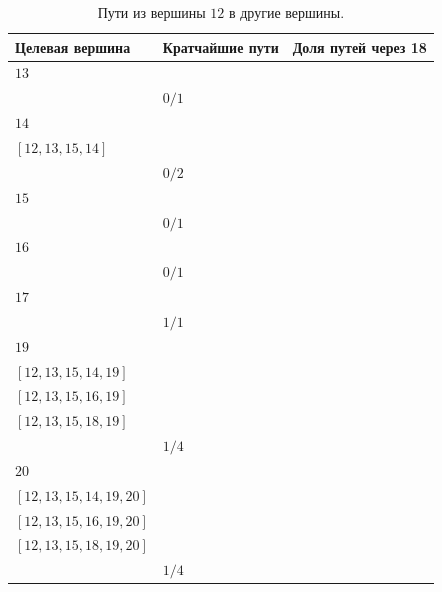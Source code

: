 \documentclass[12pt, a4paper]{extarticle}
\begin{document}
\begin{table}[h!]
    \caption{Пути из вершины $12$ в другие вершины.}
    \label{tbl:10-12}
    \begin{tabularx}{\textwidth}{|X|X|X|}
        \hline 
        Целевая вершина & Кратчайшие пути & Доля путей через 18 \\
        \hline 
        $13$ & \begin{tabular}{@{}l@{}} $[12, 13]$ \\ \end{tabular} & $0/1$ \\
        \hline
        $14$ & \begin{tabular}{@{}l@{}} $[12, 13, 9, 14]$ \\  $[12, 13, 15, 14]$ \\ \end{tabular} & $0/2$ \\
        \hline
        $15$ & \begin{tabular}{@{}l@{}} $[12, 13, 15]$ \\ \end{tabular} & $0/1$ \\
        \hline
        $16$ & \begin{tabular}{@{}l@{}} $[12, 13, 15, 16]$ \\ \end{tabular} & $0/1$ \\
        \hline
        $17$ & \begin{tabular}{@{}l@{}} $[12, 13, 15, 18, 17]$ \\ \end{tabular} & $1/1$ \\
        \hline
        $19$ & \begin{tabular}{@{}l@{}} $[12, 13, 9, 14, 19]$ \\  $[12, 13, 15, 14, 19]$ \\  $[12, 13, 15, 16, 19]$ \\  $[12, 13, 15, 18, 19]$ \\ \end{tabular} & $1/4$ \\
        \hline
        $20$ & \begin{tabular}{@{}l@{}} $[12, 13, 9, 14, 19, 20]$ \\  $[12, 13, 15, 14, 19, 20]$ \\  $[12, 13, 15, 16, 19, 20]$ \\  $[12, 13, 15, 18, 19, 20]$ \\ \end{tabular} & $1/4$ \\
        \hline
    \end{tabularx}
\end{table}
\end{document}

